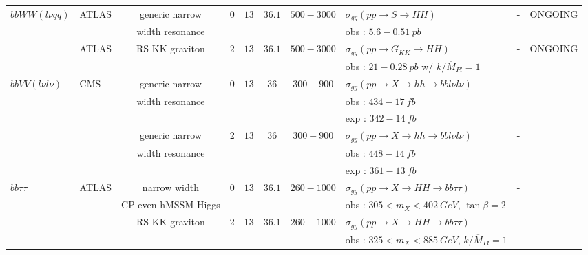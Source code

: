 \begin{table}[h!]
{\begin{tabular}{|l|l|c|c|c|c|c|l|c|c|}
\hline
$bb WW (l\nu qq)$            &ATLAS        &generic narrow         &0    &$13$        &$36.1$        &$500-3000$        &$\sigma_{gg}(pp\rightarrow S\rightarrow HH)$             &-    &ONGOING\\
                    &        &width resonance        &    &        &        &            &obs : $5.6-0.51\ pb$                            &    &\\
\cline{3-10}
                    &ATLAS        &RS KK graviton         &2    &$13$        &$36.1$        &$500-3000$        &$\sigma_{gg}(pp\rightarrow G_{KK}\rightarrow HH)$                     &-    &ONGOING\\
                    &        &                &    &        &        &            &obs : $21-0.28\ pb$ w/ $k/\overline{M}_{Pl}=1$                            &    &\\
\hline
$bb VV (l\nu l\nu)$            &CMS        &generic narrow         &0    &$13$        &$36$        &$300-900$        &$\sigma_{gg}(pp\rightarrow X\rightarrow hh\rightarrow bbl\nu l\nu)$             &-    &\cite{Sirunyan:2017guj}\\
                    &        &width resonance        &    &        &                    &        &obs : $434-17\ fb$                            &    &\\
                    &        &                &    &        &                    &        &exp : $342-14\ fb$                            &    &\\
\cline{3-10}
                    &        &generic narrow         &2    &$13$        &$36$        &$300-900$        &$\sigma_{gg}(pp\rightarrow X\rightarrow hh\rightarrow bbl\nu l\nu)$             &-    &\cite{Sirunyan:2017guj}\\
                    &        &width resonance        &    &        &                    &        &obs : $448-14\ fb$                            &    &\\
                    &        &                &    &        &                    &        &exp : $361-13\ fb$                            &    &\\
\hline

$bb \tau\tau$                &ATLAS        &narrow width            &0    &$13$        &$36.1$        &$260-1000$        &$\sigma_{gg}(pp\rightarrow X\rightarrow HH\rightarrow bb\tau\tau)$                 &-    &\cite{Aaboud:2018sfw}\\
                    &        &CP-even hMSSM Higgs        &    &        &        &            &obs : $305<m_X<402\ GeV$, $\tan{\beta}=2$                                &    &\\
\cline{3-10}
                    &        &RS KK graviton            &2    &$13$        &$36.1$        &$260-1000$        &$\sigma_{gg}(pp\rightarrow X\rightarrow HH\rightarrow bb\tau\tau)$                 &-    &\cite{Aaboud:2018sfw}\\
                    &        &                &    &        &        &            &obs : $325<m_X<885\ GeV$, $k/\overline{M}_{Pl}=1$                    &    &\\



\end{tabular}}
\end{table}
